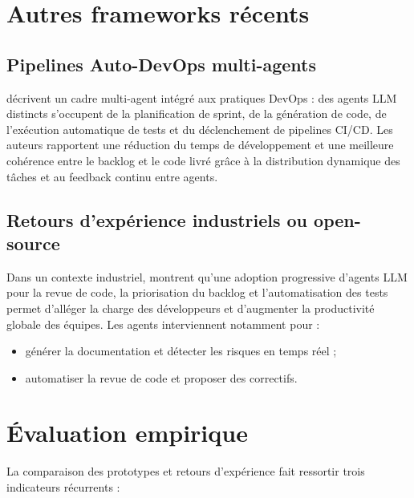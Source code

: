 \section{Autres frameworks récents}

\subsection{Pipelines Auto-DevOps multi-agents}

\textcite{khan_ai-driven_2025} décrivent un cadre multi-agent intégré aux pratiques DevOps :  
des agents LLM distincts s’occupent de la planification de sprint, de la génération de code, de l’exécution automatique de tests et du déclenchement de pipelines CI/CD.  
Les auteurs rapportent une réduction du temps de développement et une meilleure cohérence entre le backlog et le code livré grâce à la distribution dynamique des tâches et au feedback continu entre agents.
%

\subsection{Retours d’expérience industriels ou open-source}

Dans un contexte industriel, \textcite{abbas_ai-driven_2024} montrent qu’une adoption progressive d’agents LLM pour la revue de code, la priorisation du backlog et l’automatisation des tests permet d’alléger la charge des développeurs et d’augmenter la productivité globale des équipes.  
Les agents interviennent notamment pour :
\begin{itemize}
  \item générer la documentation et détecter les risques en temps réel ;
  \item automatiser la revue de code et proposer des correctifs.
\end{itemize}

\section{Évaluation empirique}

La comparaison des prototypes et retours d'expérience fait ressortir trois indicateurs récurrents :

